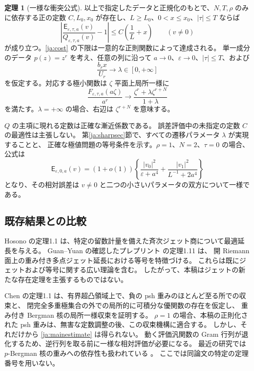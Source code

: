 \documentclass[12pt]{amsart}
\theoremstyle{definition}
\theoremstyle{remark}
\numberwithin{equation}{section}
\newcommand{\Cost}{\mathsf E}
\theoremstyle{definition}
\newtheorem{jthm}[thm]{定理}
\begin{document}
\begin{jthm}[一様な衝突公式]\label{ja:main}
以上で指定したデータと正規化のもとで、$N,T,\rho$ のみに依存する正の定数
$C,L_0,x_0$ が存在し、$L\ge L_0$、$0<x\le x_0$、$|\tau|\le T$ ならば
\begin{equation}\label{ja:mainestimate}
 \left|\frac{\Cost_{\varepsilon,\tau,a}(v)}
 {Q_{\varepsilon,\tau,a}(v)}-1\right|
 \le C\left(\frac1L+x\right)\qquad(v\ne0)
\end{equation}
が成り立つ。\eqref{ja:cost} の下限は一意的な正則関数によって達成される。
単一成分のデータ $p(z)=z^r$ を考え、任意の列に沿って
$a\to0$、$\varepsilon\to0$、$|\tau|\le T$、および
\begin{equation}\label{ja:lambda}
 \frac{b_rx}{U_r}\longrightarrow\lambda\in[0,+\infty]
\end{equation}
を仮定する。対応する極小関数は $\zeta$ 平面上局所一様に
\begin{equation}\label{ja:profile}
 \frac{F_{\varepsilon,\tau,a}(a\zeta)}{a^r}
 \longrightarrow
 \frac{\zeta^r+\lambda\zeta^{r+N}}{1+\lambda}
\end{equation}
を満たす。$\lambda=+\infty$ の場合、右辺は $\zeta^{r+N}$ を意味する。
\end{jthm}

$Q$ の主項に現れる定数は正確な漸近係数である。
誤差評価中の未指定の定数 $C$ の最適性は主張しない。
第\ref{ja:sharpsec}節で、すべての遷移パラメータ $\lambda$ が実現することと、
正確な極値問題の等号条件を示す。$\rho=1$、$N=2$、$\tau=0$ の場合、公式は
\begin{equation}\label{ja:twopointintro}
 \Cost_{\varepsilon,0,a}(v)
 =(1+o(1))\left\{
 \frac{|v_0|^2}{\varepsilon+a^4}
 +\frac{|v_1|^2}{L^{-1}+2a^4}\right\}
\end{equation}
となり、その相対誤差は $v\ne0$ と二つの小さいパラメータの双方について一様である。

\subsection{既存結果との比較}
Hosono の定理1.1 \cite{Hos20} は、特定の留数計量を備えた斉次ジェット商について最適延長を与える。
Guan--Yuan の確認したプレプリント \cite{GY25} の定理1.11 は、
開 Riemann 面上の重み付き多点ジェット延長における等号を特徴づける。
これらは既にジェットおよび等号に関する広い理論を含む。
したがって、本稿はジェットの新たな存在定理を主張するものではない。

Chen の定理1.1 \cite{Chen15} は、有界超凸領域上で、負の psh 重みのほとんど至る所での収束と、
閉完全多重極集合の外での局所的に可積分な優関数の存在を仮定し、
重み付き Bergman 核の局所一様収束を証明する。
$\rho=1$ の場合、本稿の正則化された psh 重みは、無害な定数調整の後、この収束機構に適合する。
しかし、それだけから \eqref{ja:mainestimate} は得られない。
動く評価汎関数の Gram 行列が退化するため、逆行列を取る前に一様な相対評価が必要になる。
最近の研究では $p$-Bergman 核の重みへの依存性も扱われている \cite{Zyn26}。
ここでは同論文の特定の定理番号を用いない。
\end{document}
